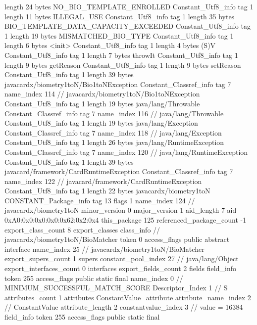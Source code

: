 {{{			length	24
			bytes	NO_BIO_TEMPLATE_ENROLLED
		}
		Constant_Utf8_info {
			tag	1
			length	11
			bytes	ILLEGAL_USE
		}
		Constant_Utf8_info {
			tag	1
			length	35
			bytes	BIO_TEMPLATE_DATA_CAPACITY_EXCEEDED
		}
		Constant_Utf8_info {
			tag	1
			length	19
			bytes	MISMATCHED_BIO_TYPE
		}
		Constant_Utf8_info {
			tag	1
			length	6
			bytes	<init>
		}
		Constant_Utf8_info {
			tag	1
			length	4
			bytes	(S)V
		}
		Constant_Utf8_info {
			tag	1
			length	7
			bytes	throwIt
		}
		Constant_Utf8_info {
			tag	1
			length	9
			bytes	getReason
		}
		Constant_Utf8_info {
			tag	1
			length	9
			bytes	setReason
		}
		Constant_Utf8_info {
			tag	1
			length	39
			bytes	javacardx/biometry1toN/Bio1toNException
		}
		Constant_Classref_info {
			tag	7
			name_index	114		// javacardx/biometry1toN/Bio1toNException
		}
		Constant_Utf8_info {
			tag	1
			length	19
			bytes	java/lang/Throwable
		}
		Constant_Classref_info {
			tag	7
			name_index	116		// java/lang/Throwable
		}
		Constant_Utf8_info {
			tag	1
			length	19
			bytes	java/lang/Exception
		}
		Constant_Classref_info {
			tag	7
			name_index	118		// java/lang/Exception
		}
		Constant_Utf8_info {
			tag	1
			length	26
			bytes	java/lang/RuntimeException
		}
		Constant_Classref_info {
			tag	7
			name_index	120		// java/lang/RuntimeException
		}
		Constant_Utf8_info {
			tag	1
			length	39
			bytes	javacard/framework/CardRuntimeException
		}
		Constant_Classref_info {
			tag	7
			name_index	122		// javacard/framework/CardRuntimeException
		}
		Constant_Utf8_info {
			tag	1
			length	22
			bytes	javacardx/biometry1toN
		}
		CONSTANT_Package_info {
			tag	13
			flags	1
			name_index	124		// javacardx/biometry1toN
			minor_version	0
			major_version	1
			aid_length	7
			aid	0xA0:0x0:0x0:0x0:0x62:0x2:0x4
		}
	}
	this_package	125
	referenced_package_count	-1
	export_class_count	8
	export_classes {
		class_info {		// javacardx/biometry1toN/BioMatcher
			token	0
			access_flags	public abstract interface
			name_index	25		// javacardx/biometry1toN/BioMatcher
			export_supers_count	1
			supers {
				constant_pool_index	27		// java/lang/Object
			}
			export_interfaces_count	0
			interfaces {
			}
			export_fields_count	2
			fields {
			field_info {
				token	255
				access_flags	public static final
				name_index	0		// MINIMUM_SUCCESSFUL_MATCH_SCORE
				Descriptor_Index	1		// S
				attributes_count	1
				attributes {
				ConstantValue_attribute {
					attribute_name_index	2		// ConstantValue
					attribute_length	2
					constantvalue_index	3		// value = 16384
				}
				}
			}
			field_info {
				token	255
				access_flags	public static final
}}}}}
